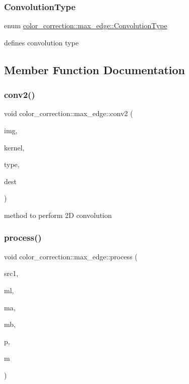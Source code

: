 \subsubsection{\texorpdfstring{Convolution\+Type}{ConvolutionType}}
{\footnotesize\ttfamily enum \hyperlink{classcolor__correction_1_1max__edge_af83c7bb6554486a755ba5133a427acc0}{color\+\_\+correction\+::max\+\_\+edge\+::\+Convolution\+Type}}

defines convolution type 

\subsection{Member Function Documentation}
\mbox{\label{classcolor__correction_1_1max__edge_af9ab5e0868c8e3d667ed63c03f6cf850}} 
\subsubsection{\texorpdfstring{conv2()}{conv2()}}
{\footnotesize\ttfamily void color\+\_\+correction\+::max\+\_\+edge\+::conv2 (\begin{DoxyParamCaption}\item[{const Mat \&}]{img,  }\item[{const Mat \&}]{kernel,  }\item[{\hyperlink{classcolor__correction_1_1max__edge_af83c7bb6554486a755ba5133a427acc0}{Convolution\+Type}}]{type,  }\item[{Mat \&}]{dest }\end{DoxyParamCaption})}

method to perform 2D convolution \mbox{\label{classcolor__correction_1_1max__edge_a1d72dd0a81e84d809dd2da19342f42a8}} 
\subsubsection{\texorpdfstring{process()}{process()}}
{\footnotesize\ttfamily void color\+\_\+correction\+::max\+\_\+edge\+::process (\begin{DoxyParamCaption}\item[{Mat}]{src1,  }\item[{float $\ast$}]{ml,  }\item[{float $\ast$}]{ma,  }\item[{float $\ast$}]{mb,  }\item[{int}]{p,  }\item[{int}]{m }\end{DoxyParamCaption})}

